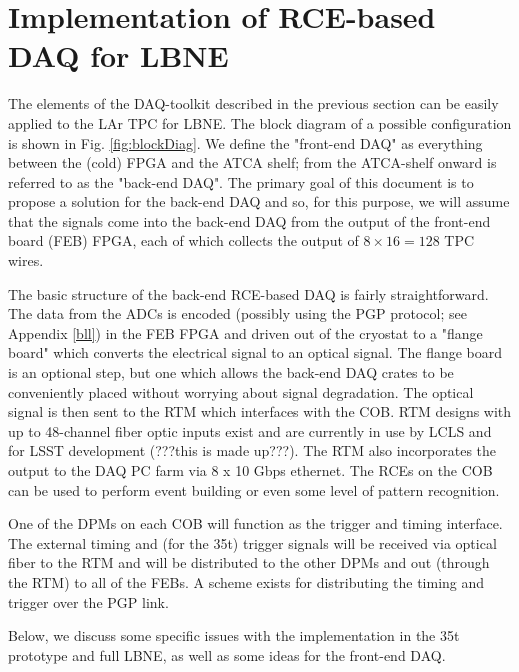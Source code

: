 \section{Implementation of RCE-based DAQ for LBNE}


The elements of the DAQ-toolkit described in the previous section can be easily applied to the LAr TPC for LBNE.  The block diagram of a possible configuration is shown in Fig. \ref{fig:blockDiag}.  We define the "front-end DAQ" as everything between the (cold) FPGA and the ATCA shelf; from the ATCA-shelf onward is referred to as the "back-end DAQ".    The primary goal of this document is to propose a solution for the back-end DAQ and so, for this purpose, we will assume that the signals come into the back-end DAQ from the output of the front-end board (FEB) FPGA, each of which collects the output of  $8\times 16 = 128$ TPC wires.  

The basic structure of the back-end RCE-based DAQ is fairly straightforward.  The data from the ADCs is encoded (possibly using the PGP protocol; see Appendix \ref{bll}) in the FEB FPGA and driven out of the cryostat to a "flange board" which converts the electrical signal to an optical signal.  The flange board is an optional step, but one which allows the back-end DAQ crates to be conveniently placed without worrying about signal degradation.   The optical signal is then sent to the RTM which interfaces with the COB.  RTM designs with up to 48-channel fiber optic inputs exist and are currently in use by LCLS and for LSST development (???this is made up???).  The RTM also incorporates the output to the DAQ PC farm via 8 x 10 Gbps ethernet.  The RCEs on the COB can be used to perform event building or even some level of pattern recognition. 

One of the DPMs on each COB will function as the trigger and timing interface.  The  external timing and (for the 35t) trigger signals will be received via optical fiber to the RTM and will be distributed to the other DPMs and out (through the RTM) to all of the FEBs.  A scheme exists for distributing the timing and trigger over the PGP link.  

Below, we discuss some specific issues with the implementation in the 35t prototype and full LBNE, as well as some ideas for the front-end DAQ.   


